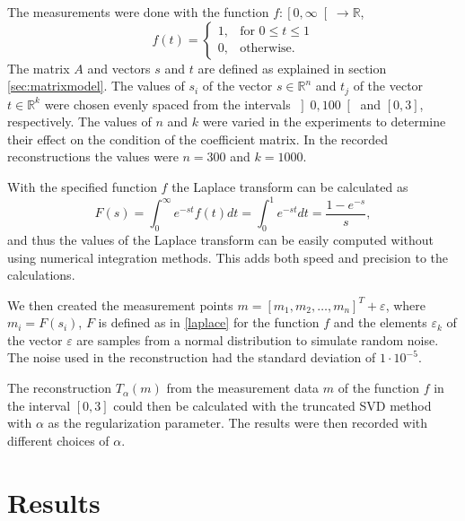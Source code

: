 \documentclass[12pt,a4]{article}
\newcommand{\R}{{\mathbb R}}
\newcommand{\ra}{\rightarrow}
\newcommand{\eps}{\varepsilon}
\begin{document}
The measurements were done with the function $f: \left[ 0, \infty \right[ \ra \R$,
\begin{equation}\label{eq:f}
f(t) = 
\begin{cases}
1, & \text{for } 0 \leq t \leq 1 \\
0, & \text{otherwise}.
\end{cases}
\end{equation}
The matrix $A$ and vectors $s$ and $t$ are defined as explained in section \ref{sec:matrixmodel}. The values of $s_i$ of the vector $s \in \R^n$ and $t_j$ of the vector $t \in \R^k$ were chosen evenly spaced from the intervals $\left] 0, 100 \right[$ and $\left[ 0,3 \right]$, respectively. The values of $n$ and $k$ were varied in the experiments to determine their effect on the condition of the coefficient matrix. In the recorded reconstructions the values were $n = 300$ and $k = 1000$.

With the specified function $f$ the Laplace transform can be calculated as
\begin{equation}
F(s) = \int_0^{\infty} e^{-st} f(t) dt
     = \int_0^1 e^{-st} dt
     = \frac{1 - e^{-s}}{s},
\end{equation}
and thus the values of the Laplace transform can be easily computed without using numerical integration methods. This adds both speed and precision to the calculations.

We then created the measurement points $m = [m_1, m_2, \ldots, m_n]^T + \eps$, where $m_i = F(s_i)$, $F$ is defined as in \eqref{laplace} for the function $f$ and the elements $\eps_k$ of the vector $\eps$ are samples from a normal distribution to simulate random noise. The noise used in the reconstruction had the standard deviation of $1 \cdot 10^{-5}$.

The reconstruction $T_\alpha(m)$ from the measurement data $m$ of the function $f$ in the interval $\left[0,3\right]$ could then be calculated with the truncated SVD method with $\alpha$ as the regularization parameter. The results were then recorded with different choices of $\alpha$.



\section{Results}\label{sec:results}
\end{document}
